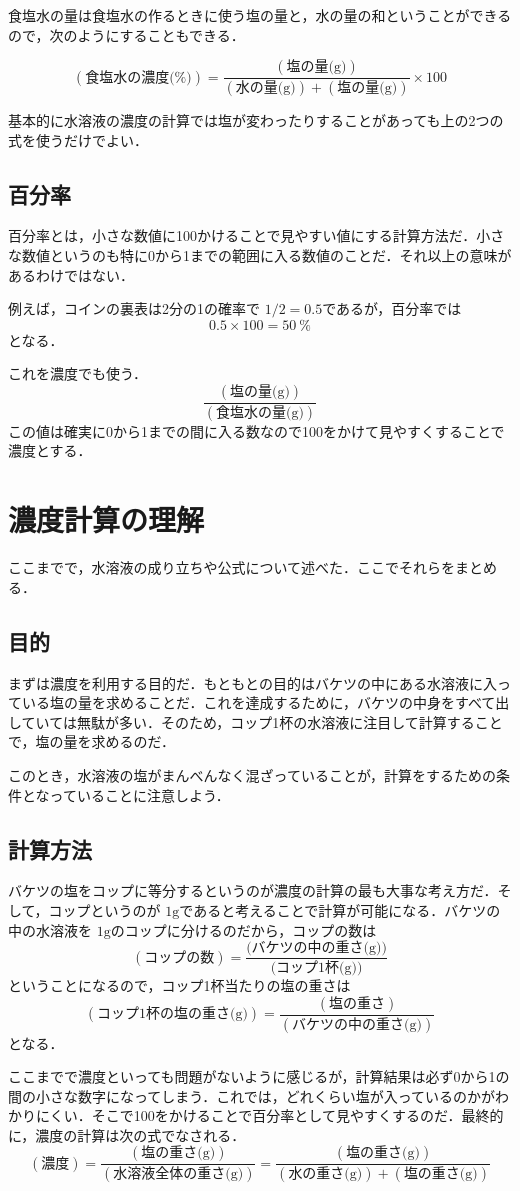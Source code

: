 \documentclass[dvipdfmx,18pt]{jsarticle}
\begin{document}
    食塩水の量は食塩水の作るときに使う塩の量と，水の量の和ということができるので，次のようにすることもできる．

    \begin{equation}
        (\text{食塩水の濃度(\%)}) = \frac{(\text{塩の量(g)})}{(\text{水の量(g)})+(\text{塩の量(g)})}\times 100
    \end{equation}

    基本的に水溶液の濃度の計算では塩が変わったりすることがあっても上の2つの式を使うだけでよい．

    \subsection{百分率}
    百分率とは，小さな数値に100かけることで見やすい値にする計算方法だ．小さな数値というのも特に0から1までの範囲に入る数値のことだ．それ以上の意味があるわけではない．

    例えば，コインの裏表は2分の1の確率で \(1/2=0.5\)であるが，百分率では
    \[
    0.5\times 100 =50\ \%
    \]
    となる．

    これを濃度でも使う．
    \[
    \frac{(\text{塩の量(g)})}{(\text{食塩水の量(g)})}
    \]
    この値は確実に0から1までの間に入る数なので100をかけて見やすくすることで濃度とする．

    \section{濃度計算の理解}
    ここまでで，水溶液の成り立ちや公式について述べた．ここでそれらをまとめる．
    \subsection{目的}
    まずは濃度を利用する目的だ．もともとの目的はバケツの中にある水溶液に入っている塩の量を求めることだ．これを達成するために，バケツの中身をすべて出していては無駄が多い．そのため，コップ1杯の水溶液に注目して計算することで，塩の量を求めるのだ．

    このとき，水溶液の塩がまんべんなく混ざっていることが，計算をするための条件となっていることに注意しよう．

    \subsection{計算方法}
    バケツの塩をコップに等分するというのが濃度の計算の最も大事な考え方だ．そして，コップというのが \(1\mathrm{g}\)であると考えることで計算が可能になる．バケツの中の水溶液を \(1\mathrm{g}\)のコップに分けるのだから，コップの数は
    \[
       (\text{コップの数})= \frac{\text{(バケツの中の重さ(g))}}{\text{(コップ1杯(g))}}
    \]
    ということになるので，コップ1杯当たりの塩の重さは
    \[
        (\text{コップ1杯の塩の重さ(g)})= \frac{(\text{塩の重さ})}{(\text{バケツの中の重さ(g)})}
    \]
    となる．

    ここまでで濃度といっても問題がないように感じるが，計算結果は必ず0から1の間の小さな数字になってしまう．これでは，どれくらい塩が入っているのかがわかりにくい．そこで100をかけることで百分率として見やすくするのだ．最終的に，濃度の計算は次の式でなされる．
    \begin{equation}
        (\text{濃度})=\frac{(\text{塩の重さ(g)})}{(\text{水溶液全体の重さ(g)})}=\frac{(\text{塩の重さ(g)})}{(\text{水の重さ(g)})+(\text{塩の重さ(g)})}
    \end{equation}
\end{document}
